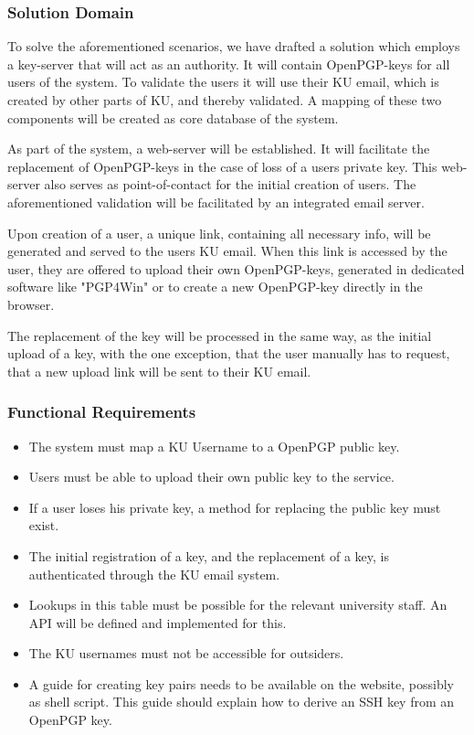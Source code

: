 \documentclass[11pt,a4paper]{report}
\begin{document}
\subsubsection{Solution Domain}

To solve the aforementioned scenarios, we have drafted a solution which employs a key-server that will act as an authority. It will contain OpenPGP-keys for all users of the system. To validate the users it will use their KU email, which is created by other parts of KU, and thereby validated. A mapping of these two components will be created as core database of the system.

As part of the system, a web-server will be established. It will facilitate the replacement of OpenPGP-keys in the case of loss of a users private key. This web-server also serves as point-of-contact for the initial creation of users. The aforementioned validation will be facilitated by an integrated email server.

Upon creation of a user, a unique link, containing all necessary info, will be generated and served to the users KU email. When this link is accessed by the user, they are offered to upload their own OpenPGP-keys, generated in dedicated software like "PGP4Win" or to create a new OpenPGP-key directly in the browser.

The replacement of the key will be processed in the same way, as the initial upload of a key, with the one exception, that the user manually has to request, that a new upload link will be sent to their KU email.


\subsubsection{Functional Requirements}
\begin{itemize}
\item The system must map a KU Username to a OpenPGP public key.
\item Users must be able to upload their own public key to the service.
\item If a user loses his private key, a method for replacing the public key must exist.
\item The initial registration of a key, and the replacement of a key, is authenticated through the KU email system.
\item Lookups in this table must be possible for the relevant university staff. An API will be defined and implemented for this.
\item The KU usernames must not be accessible for outsiders.
\item A guide for creating key pairs needs to be available on the website, possibly as shell script. This guide should explain how to derive an SSH key from an OpenPGP key.
\end{itemize}
\end{document}
